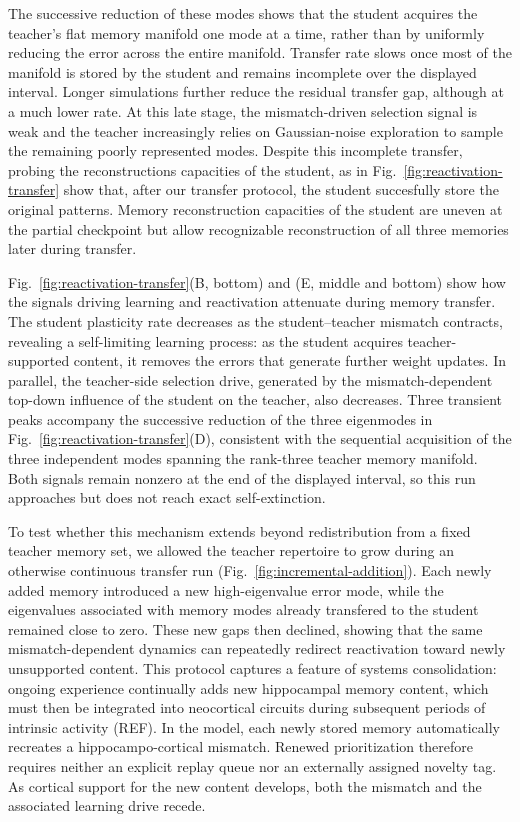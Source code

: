 \documentclass[10pt,letterpaper]{article}
\theoremstyle{plain}
\theoremstyle{remark}
\begin{document}
The successive reduction of these modes shows that the student acquires the teacher's flat memory manifold one mode at a time, rather than by uniformly reducing the error across the entire manifold. Transfer rate slows once most of the manifold is stored by the student and remains incomplete over the displayed interval. Longer simulations further reduce the residual transfer gap, although at a much lower rate. At this late stage, the mismatch-driven selection signal is weak and the teacher increasingly relies on Gaussian-noise exploration to sample the remaining poorly represented modes. Despite this incomplete transfer, probing the reconstructions capacities of the student, as in Fig.~\ref{fig:reactivation-transfer} show that, after our transfer protocol, the student succesfully store the original patterns. Memory reconstruction capacities of the student are uneven at the partial checkpoint but allow recognizable reconstruction of all three memories later during transfer.

Fig.~\ref{fig:reactivation-transfer}(B, bottom) and (E, middle and bottom) show how the signals driving learning and reactivation attenuate during memory transfer. The student plasticity rate decreases as the student--teacher mismatch contracts, revealing a self-limiting learning process: as the student acquires teacher-supported content, it removes the errors that generate further weight updates. In parallel, the teacher-side selection drive, generated by the mismatch-dependent top-down influence of the student on the teacher, also decreases. Three transient peaks accompany the successive reduction of the three eigenmodes in Fig.~\ref{fig:reactivation-transfer}(D), consistent with the sequential acquisition of the three independent modes spanning the rank-three teacher memory manifold. Both signals remain nonzero at the end of the displayed interval, so this run approaches but does not reach exact self-extinction.

To test whether this mechanism extends beyond redistribution from a fixed teacher memory set, we allowed the teacher repertoire to grow during an otherwise continuous transfer run (Fig.~\ref{fig:incremental-addition}). Each newly added memory introduced a new high-eigenvalue error mode, while the eigenvalues associated with memory modes already transfered to the student remained close to zero. These new gaps then declined, showing that the same mismatch-dependent dynamics can repeatedly redirect reactivation toward newly unsupported content. This protocol captures a feature of systems consolidation: ongoing experience continually adds new hippocampal memory content, which must then be integrated into neocortical circuits during subsequent periods of intrinsic activity (REF). In the model, each newly stored memory automatically recreates a hippocampo-cortical mismatch. Renewed prioritization therefore requires neither an explicit replay queue nor an externally assigned novelty tag. As cortical support for the new content develops, both the mismatch and the associated learning drive recede.
\end{document}
